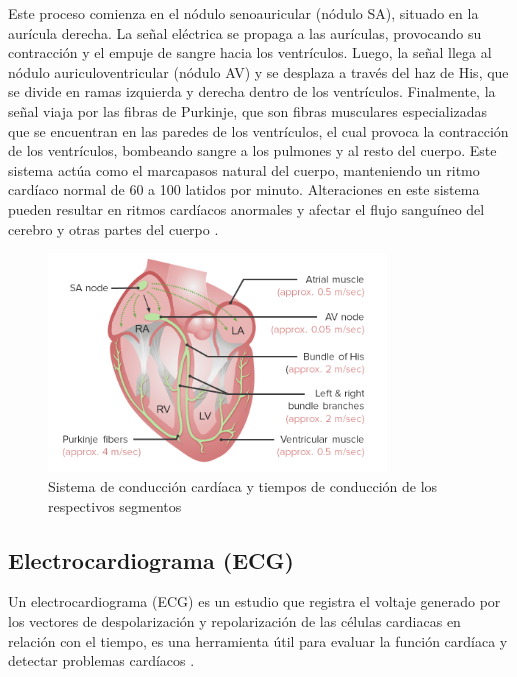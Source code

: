      Este proceso comienza en el nódulo senoauricular (nódulo SA), situado en la aurícula derecha. La señal eléctrica se propaga a las aurículas, provocando su contracción y el empuje de sangre hacia los ventrículos. Luego, la señal llega al nódulo auriculoventricular (nódulo AV) y se desplaza a través del haz de His, que se divide en ramas izquierda y derecha dentro de los ventrículos. Finalmente, la señal viaja por las fibras de Purkinje, que son fibras musculares especializadas que se encuentran en las paredes de los ventrículos, el cual provoca la contracción de los ventrículos, bombeando sangre a los pulmones y al resto del cuerpo. Este sistema actúa como el marcapasos natural del cuerpo, manteniendo un ritmo cardíaco normal de 60 a 100 latidos por minuto. Alteraciones en este sistema pueden resultar en ritmos cardíacos anormales y afectar el flujo sanguíneo del cerebro y otras partes del cuerpo \cite{SistemaConduccionMSD}.

    \begin{figure}[H]
        \centering
        \includegraphics[width=0.8\textwidth]{img/sistemaConduccion.png}
        \caption[Sistema de conducción cardíaca y tiempos de conducción de los respectivos segmentos]{Sistema de conducción cardíaca y tiempos de conducción de los respectivos segmentos\footnotemark}
        \label{fig:sistemaConduccion}
    \end{figure}

    \subsection{Electrocardiograma (ECG)}
    Un electrocardiograma (ECG) es un estudio que registra el voltaje generado por los vectores de despolarización y repolarización de las células cardiacas en relación con el tiempo, es una herramienta útil para evaluar la función cardíaca y detectar problemas cardíacos \cite{ECG_Definicion}.

